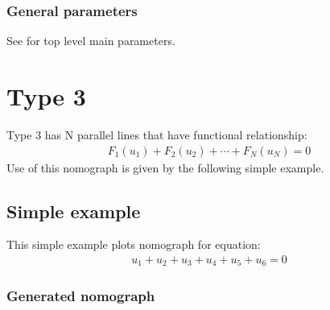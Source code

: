\documentclass[a4paper,11pt,english]{sphinxmanual}
\begin{document}
\subsubsection{General parameters}
\label{\detokenize{types/types:id5}}
See {\hyperref[\detokenize{main_params:main-params}]{}} for top level main parameters.


\section{Type 3}
\label{\detokenize{types/types:type-3}}\label{\detokenize{types/types:type3-ref}}
Type 3 has N parallel lines that have functional relationship:
\begin{equation*}
\begin{split}F_1(u_1) + F_2(u_2) + \cdots + F_N(u_N) = 0\end{split}
\end{equation*}
Use of this nomograph is given by the following
simple example.


\subsection{Simple example}
\label{\detokenize{types/types:id6}}
This simple example plots nomograph for equation:
\begin{equation*}
\begin{split}u_1 + u_2 + u_3 + u_4 + u_5 + u_6 = 0\end{split}
\end{equation*}

\subsubsection{Generated nomograph}
\label{\detokenize{types/types:id7}}
\noindent{}
\end{document}
